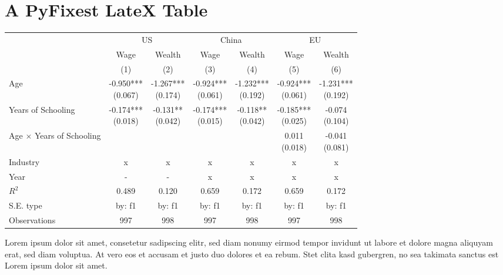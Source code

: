 \documentclass{article}%
\begin{document}
%
\normalsize%
\section{A PyFixest LateX Table}%
\label{sec:APyFixestLateXTable}%


\begin{table}[htbp]%
\renewcommand\cellalign{t}
\begin{threeparttable}
\begin{tabular}{lcccccc}
\toprule
 & \multicolumn{2}{c}{US} & \multicolumn{2}{c}{China} & \multicolumn{2}{c}{EU} \\
\cmidrule(lr){2-3} \cmidrule(lr){4-5} \cmidrule(lr){6-7}
 & Wage & Wealth & Wage & Wealth & Wage & Wealth \\
 & (1) & (2) & (3) & (4) & (5) & (6) \\
\midrule
Age & \makecell{-0.950*** \\ (0.067)} & \makecell{-1.267*** \\ (0.174)} & \makecell{-0.924*** \\ (0.061)} & \makecell{-1.232*** \\ (0.192)} & \makecell{-0.924*** \\ (0.061)} & \makecell{-1.231*** \\ (0.192)} \\
Years of Schooling & \makecell{-0.174*** \\ (0.018)} & \makecell{-0.131** \\ (0.042)} & \makecell{-0.174*** \\ (0.015)} & \makecell{-0.118** \\ (0.042)} & \makecell{-0.185*** \\ (0.025)} & \makecell{-0.074 \\ (0.104)} \\
Age $\times$ Years of Schooling &  &  &  &  & \makecell{0.011 \\ (0.018)} & \makecell{-0.041 \\ (0.081)} \\
\midrule
Industry & x & x & x & x & x & x \\
Year & - & - & x & x & x & x \\
\midrule
$R^2$ & 0.489 & 0.120 & 0.659 & 0.172 & 0.659 & 0.172 \\
S.E. type & by: f1 & by: f1 & by: f1 & by: f1 & by: f1 & by: f1 \\
Observations & 997 & 998 & 997 & 998 & 997 & 998 \\
\bottomrule
\end{tabular}
\footnotesize Lorem ipsum dolor sit amet, consetetur sadipscing elitr, sed diam nonumy eirmod tempor invidunt ut labore et dolore magna aliquyam erat, sed diam voluptua. At vero eos et accusam et justo duo dolores et ea rebum. Stet clita kasd gubergren, no sea takimata sanctus est Lorem ipsum dolor sit amet.
\end{threeparttable}%
\end{table}

%
\end{document}
